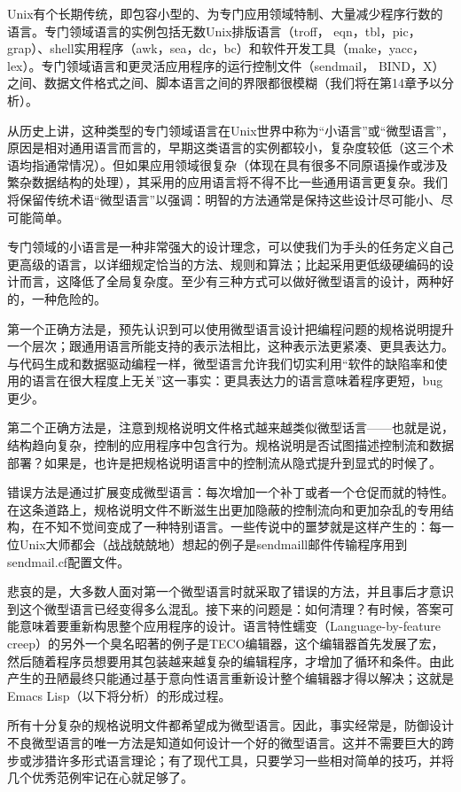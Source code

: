 \documentclass[12pt,oneside]{ctexbook}
\begin{document}
\begin{common-format}
Unix有个长期传统，即包容小型的、为专门应用领域特制、大量减少程序行数的语言。专门领域语言的实例包括无数Unix排版语言（troff， eqn，tbl，pic，grap）、shell实用程序（awk，sea，dc，bc）和软件开发工具（make，yacc，lex）。专门领域语言和更灵活应用程序的运行控制文件（sendmail， BIND，X）之间、数据文件格式之间、脚本语言之间的界限都很模糊（我们将在第14章予以分析）。

从历史上讲，这种类型的专门领域语言在Unix世界中称为“小语言”或“微型语言”，原因是相对通用语言而言的，早期这类语言的实例都较小，复杂度较低（这三个术语均指通常情况）。但如果应用领域很复杂（体现在具有很多不同原语操作或涉及繁杂数据结构的处理），其采用的应用语言将不得不比一些通用语言更复杂。我们将保留传统术语“微型语言”以强调：明智的方法通常是保持这些设计尽可能小、尽可能简单。

专门领域的小语言是一种非常强大的设计理念，可以使我们为手头的任务定义自己更高级的语言，以详细规定恰当的方法、规则和算法；比起采用更低级硬编码的设计而言，这降低了全局复杂度。至少有三种方式可以做好微型语言的设计，两种好的，一种危险的。

第一个正确方法是，预先认识到可以使用微型语言设计把编程问题的规格说明提升一个层次；跟通用语言所能支持的表示法相比，这种表示法更紧凑、更具表达力。与代码生成和数据驱动编程一样，微型语言允许我们切实利用“软件的缺陷率和使用的语言在很大程度上无关”这一事实：更具表达力的语言意味着程序更短，bug更少。

第二个正确方法是，注意到规格说明文件格式越来越类似微型话言——也就是说，结构趋向复杂，控制的应用程序中包含行为。规格说明是否试图描述控制流和数据部署？如果是，也许是把规格说明语言中的控制流从隐式提升到显式的时候了。

错误方法是通过扩展变成微型语言：每次增加一个补丁或者一个仓促而就的特性。在这条道路上，规格说明文件不断滋生出更加隐蔽的控制流向和更加杂乱的专用结构，在不知不觉间变成了一种特别语言。一些传说中的噩梦就是这样产生的：每一位Unix大师都会（战战兢兢地）想起的例子是sendmaill邮件传输程序用到sendmail.cf配置文件。

悲哀的是，大多数人面对第一个微型语言时就采取了错误的方法，并且事后才意识到这个微型语言已经变得多么混乱。接下来的问题是：如何清理？有时候，答案可能意味着要重新构思整个应用程序的设计。语言特性蠕变（Language-by-feature creep）的另外一个臭名昭著的例子是TECO编辑器，这个编辑器首先发展了宏，然后随着程序员想要用其包装越来越复杂的编辑程序，才增加了循环和条件。由此产生的丑陋最终只能通过基于意向性语言重新设计整个编辑器才得以解决；这就是Emacs Lisp（以下将分析）的形成过程。

所有十分复杂的规格说明文件都希望成为微型语言。因此，事实经常是，防御设计不良微型语言的唯一方法是知道如何设计一个好的微型语言。这并不需要巨大的跨步或涉猎许多形式语言理论；有了现代工具，只要学习一些相对简单的技巧，并将几个优秀范例牢记在心就足够了。


\end{common-format}
\end{document}
